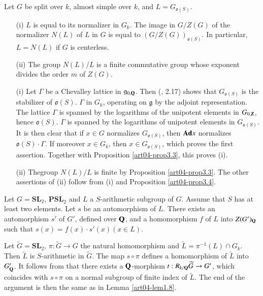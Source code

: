 \begin{lemma}\label{art04-lem4.1}
Let $G$ be split over $k$, almost simple over $k$, and $L=G_{\mathfrak{o}(S)}$.
\begin{itemize}
\item[{\rm(i)}] $L$ is equal to its normalizer in $G_{k}$. The image in $G/Z(G)$ of the normalizer $N(L)$ of $L$ in $G$ is equal to $(G/Z(G))_{\mathfrak{o}(S)}$. In particular, $L=N(L)$ if $G$ is centerless.

\item[{\rm(ii)}] The group $N(L)/L$ is a finite commutative group whose exponent divides the order $m$ of $Z(G)$.
\end{itemize}
\end{lemma}

\begin{itemize}
\item[(i)] Let $\Gamma$ be a Chevalley lattice in $\mathfrak{g}_{0,\mathbf{Q}}$. Then (\cite{art04-key16}, 2.17) shows that $G_{\mathfrak{o}(S)}$ is the stabilizer of $\mathfrak{o}(S)$. $\Gamma$ in $G_{k}$, operating on $\mathfrak{g}$ by the adjoint representation. The lattice $\Gamma$ is spanned by the logarithms of the unipotent elements in $G_{0,\mathbf{Z}}$, hence $\mathfrak{o}(S)$. $\Gamma$ is spanned by the logarithms of unipotent elements in $G_{\mathfrak{o}(S)}$. It is then clear that if $x\in G$ normalizes $G_{\mathfrak{o}(S)}$, then $\mathbf{Ad} x$ normalizes $\mathfrak{o}(S)\cdot \Gamma$. If moreover $x\in G_{k}$, then $x\in G_{\mathfrak{o}(S)}$, which proves the first assertion. Together with Proposition \ref{art04-prop3.3}, this proves (i).

\item[(ii)] The\pageoriginale group $N(L)/L$ is finite by Proposition \ref{art04-prop3.3}. The other assertions of (ii) follow from (i) and Proposition \ref{art04-prop3.4}.
\end{itemize}

\begin{lemma}\label{art04-lem4.2}
Let $G=\mathbf{SL}_{2}$, $\mathbf{PSL}_{2}$ and $L$ a $S$-arithmetic subgroup of $G$. Assume that $S$ has at least two elements. Let $s$ be an automorphism of $L$. There exists an automorphism $s'$ of $G'$, defined over $\mathbf{Q}$, and a homomorphism $f$ of $L$ into $Z(G')_{\mathbf{Q}}$ such that $s(x)=f(x)\cdot s'(x)(x\in L)$.
\end{lemma}

Let $\widetilde{G}=\mathbf{SL}_{2}$, $\pi :\widetilde{G}\to G$ the natural homomorphism and $\widetilde{L}=\pi^{-1}(L)\cap G_{k}$. Then $\widetilde{L}$ is $S$-arithmetic in $\widetilde{G}$. The map $s\circ \pi$ defines a homomorphism of $\widetilde{L}$ into $G'_{\mathbf{Q}}$. It follows from \cite{art04-key29} that there exists a $\mathbf{Q}$-morphism $t:R_{k/\mathbf{Q}}\widetilde{G}\to G'$, which coincides with $s\circ \pi$ on a normal subgroup of finite index of $\widetilde{L}$. The end of the argument is then the same as in Lemma \ref{art04-lem1.8}.

